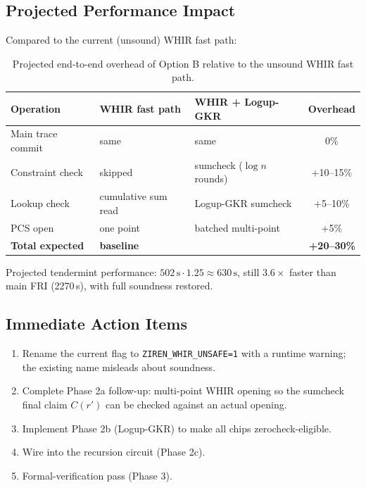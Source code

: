 \subsection{Projected Performance Impact}

Compared to the current (unsound) WHIR fast path:

\begin{table}[h]
\centering
\small
\begin{tabular}{lllc}
\toprule
\textbf{Operation} & \textbf{WHIR fast path} & \textbf{WHIR + Logup-GKR} & \textbf{Overhead} \\
\midrule
Main trace commit   & same   & same    & 0\%       \\
Constraint check    & skipped & sumcheck ($\log n$ rounds) & +10--15\% \\
Lookup check        & cumulative sum read & Logup-GKR sumcheck & +5--10\%  \\
PCS open            & one point & batched multi-point & +5\%      \\
\midrule
\textbf{Total expected} & \textbf{baseline} & \multicolumn{2}{r}{\textbf{+20--30\%}} \\
\bottomrule
\end{tabular}
\caption{Projected end-to-end overhead of Option B relative to the unsound
WHIR fast path.}
\label{tab:sound-overhead}
\end{table}

Projected tendermint performance: $502\,\text{s} \cdot 1.25 \approx 630\,\text{s}$,
still $\mathbf{3.6\times}$ faster than main FRI (2270\,s), with full
soundness restored.

\subsection{Immediate Action Items}
\begin{enumerate}
  \item Rename the current flag to \texttt{ZIREN\_WHIR\_UNSAFE=1} with a
        runtime warning; the existing name misleads about soundness.
  \item Complete Phase 2a follow-up: multi-point WHIR opening so the
        sumcheck final claim $C(r')$ can be checked against an actual
        opening.
  \item Implement Phase 2b (Logup-GKR) to make all chips zerocheck-eligible.
  \item Wire into the recursion circuit (Phase 2c).
  \item Formal-verification pass (Phase 3).
\end{enumerate}

